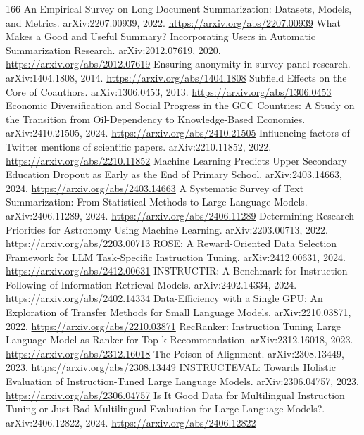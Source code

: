 \documentclass[11pt]{article}
\begin{document}
\begin{thebibliography}{166}
 An Empirical Survey on Long Document Summarization: Datasets, Models, and Metrics. arXiv:2207.00939, 2022. \url{https://arxiv.org/abs/2207.00939}
 What Makes a Good and Useful Summary? Incorporating Users in Automatic Summarization Research. arXiv:2012.07619, 2020. \url{https://arxiv.org/abs/2012.07619}
 Ensuring anonymity in survey panel research. arXiv:1404.1808, 2014. \url{https://arxiv.org/abs/1404.1808}
 Subfield Effects on the Core of Coauthors. arXiv:1306.0453, 2013. \url{https://arxiv.org/abs/1306.0453}
 Economic Diversification and Social Progress in the GCC Countries: A Study on the Transition from Oil-Dependency to Knowledge-Based Economies. arXiv:2410.21505, 2024. \url{https://arxiv.org/abs/2410.21505}
 Influencing factors of Twitter mentions of scientific papers. arXiv:2210.11852, 2022. \url{https://arxiv.org/abs/2210.11852}
 Machine Learning Predicts Upper Secondary Education Dropout as Early as the End of Primary School. arXiv:2403.14663, 2024. \url{https://arxiv.org/abs/2403.14663}
 A Systematic Survey of Text Summarization: From Statistical Methods to Large Language Models. arXiv:2406.11289, 2024. \url{https://arxiv.org/abs/2406.11289}
 Determining Research Priorities for Astronomy Using Machine Learning. arXiv:2203.00713, 2022. \url{https://arxiv.org/abs/2203.00713}
 ROSE: A Reward-Oriented Data Selection Framework for LLM Task-Specific Instruction Tuning. arXiv:2412.00631, 2024. \url{https://arxiv.org/abs/2412.00631}
 INSTRUCTIR: A Benchmark for Instruction Following of Information Retrieval Models. arXiv:2402.14334, 2024. \url{https://arxiv.org/abs/2402.14334}
 Data-Efficiency with a Single GPU: An Exploration of Transfer Methods for Small Language Models. arXiv:2210.03871, 2022. \url{https://arxiv.org/abs/2210.03871}
 RecRanker: Instruction Tuning Large Language Model as Ranker for Top-k Recommendation. arXiv:2312.16018, 2023. \url{https://arxiv.org/abs/2312.16018}
 The Poison of Alignment. arXiv:2308.13449, 2023. \url{https://arxiv.org/abs/2308.13449}
 INSTRUCTEVAL: Towards Holistic Evaluation of Instruction-Tuned Large Language Models. arXiv:2306.04757, 2023. \url{https://arxiv.org/abs/2306.04757}
 Is It Good Data for Multilingual Instruction Tuning or Just Bad Multilingual Evaluation for Large Language Models?. arXiv:2406.12822, 2024. \url{https://arxiv.org/abs/2406.12822}
\end{thebibliography}
\end{document}
